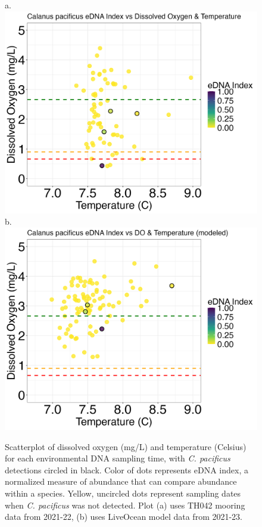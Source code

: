 \documentclass[12pt,twoside]{reedthesis}
\begin{document}
	
	\begin{figure}[!h]
		\begin{center}
			a. \includegraphics[scale=0.3]{Cpacificus_Scatter_noOut}
			b. \includegraphics[scale=0.3]{Cpacificus_Scatter_AllYr_mod_noOut}
			\caption[\textit{C. pacificus} scatterplot]{\footnotesize{Scatterplot of dissolved oxygen (mg/L) and temperature (Celsius) for each environmental DNA sampling time, with \textit{C. pacificus} detections circled in black. Color of dots represents eDNA index, a normalized measure of abundance that can compare abundance within a species. Yellow, uncircled dots represent sampling dates when \textit{C. pacificus} was not detected. Plot (a) uses TH042 mooring data from 2021-22, (b) uses LiveOcean model data from 2021-23.}} %
			\label{CpacificusScatter}
		\end{center}
	\end{figure} 
	
\end{document}
